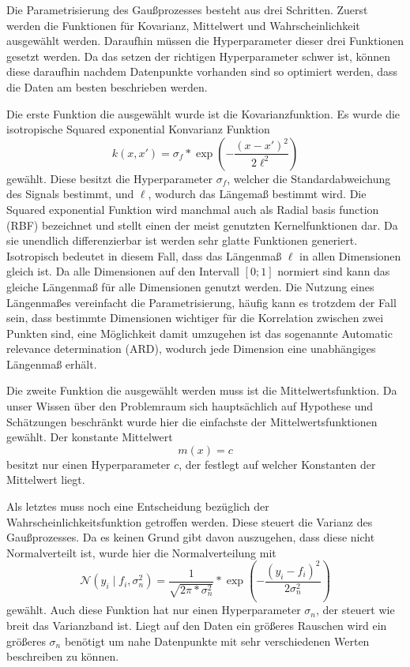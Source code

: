 Die Parametrisierung des Gaußprozesses besteht aus drei Schritten.
Zuerst werden die Funktionen für Kovarianz, Mittelwert und Wahrscheinlichkeit ausgewählt werden.
Daraufhin müssen die Hyperparameter dieser drei Funktionen gesetzt werden.
Da das setzen der richtigen Hyperparameter schwer ist, können diese daraufhin nachdem Datenpunkte vorhanden sind so optimiert werden, dass die Daten am besten beschrieben werden.

Die erste Funktion die ausgewählt wurde ist die Kovarianzfunktion.
Es wurde die isotropische Squared exponential Konvarianz Funktion 
\[
	k(x,x') = \sigma_f * \exp\left(-\frac{(x-x')^2}{2\ell^2}\right)
\]
gewählt.
Diese besitzt die Hyperparameter $\sigma_f$, welcher die Standardabweichung des Signals bestimmt, und $\ell$, wodurch das Längemaß bestimmt wird.
Die Squared exponential Funktion wird manchmal auch als Radial basis function (RBF) bezeichnet und stellt einen der meist genutzten Kernelfunktionen dar.
Da sie unendlich differenzierbar ist werden sehr glatte Funktionen generiert.
Isotropisch bedeutet in diesem Fall, dass das Längenmaß $\ell$ in allen Dimensionen gleich ist.
Da alle Dimensionen auf den Intervall $[0;1]$ normiert sind kann das gleiche Längenmaß für alle Dimensionen genutzt werden.
Die Nutzung eines Längenmaßes vereinfacht die Parametrisierung, häufig kann es trotzdem der Fall sein, dass bestimmte Dimensionen wichtiger für die Korrelation zwischen zwei Punkten sind, eine Möglichkeit damit umzugehen ist das sogenannte Automatic relevance determination (ARD), wodurch jede Dimension eine unabhängiges Längenmaß erhält.

Die zweite Funktion die ausgewählt werden muss ist die Mittelwertsfunktion. Da unser Wissen über den Problemraum sich hauptsächlich auf Hypothese und Schätzungen beschränkt wurde hier die einfachste der Mittelwertsfunktionen gewählt. 
Der konstante Mittelwert
\[
	m(x) = c
\]
besitzt nur einen Hyperparameter $c$, der festlegt auf welcher Konstanten der Mittelwert liegt.

Als letztes muss noch eine Entscheidung bezüglich der Wahrscheinlichkeitsfunktion getroffen werden.
Diese steuert die Varianz des Gaußprozesses.
Da es keinen Grund gibt davon auszugehen, dass diese nicht Normalverteilt ist, wurde hier die Normalverteilung mit
\[
	\mathcal{N}(y_i \mid f_i, \sigma_n^2) = \frac{1}{\sqrt{2\pi*\sigma_n^2}}*\exp\left(-\frac{(y_i - f_i)^2}{2\sigma_n^2}\right)
\]
gewählt.
Auch diese Funktion hat nur einen Hyperparameter $\sigma_n$, der steuert wie breit das Varianzband ist.
Liegt auf den Daten ein größeres Rauschen wird ein größeres $\sigma_n$ benötigt um nahe Datenpunkte mit sehr verschiedenen Werten beschreiben zu können.

